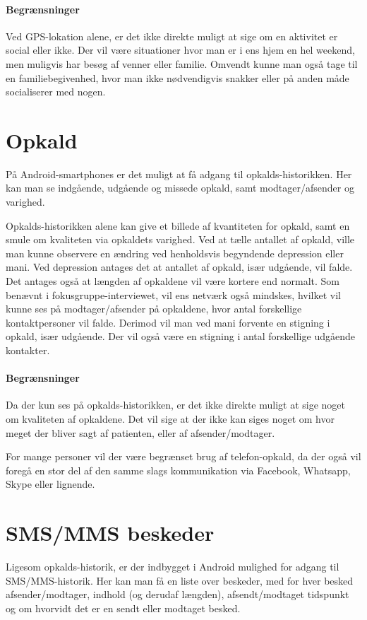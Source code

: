 \paragraph{Begrænsninger}
Ved GPS-lokation alene, er det ikke direkte muligt at sige om en aktivitet er social eller ikke.
Der vil være situationer hvor man er i ens hjem en hel weekend, men muligvis har besøg af venner eller familie.
Omvendt kunne man også tage til en familiebegivenhed, hvor man ikke nødvendigvis snakker eller på anden måde socialiserer med nogen.

\section{Opkald}
På Android-smartphones er det muligt at få adgang til opkalds-historikken.
Her kan man se indgående, udgående og missede opkald, samt modtager/afsender og varighed.

Opkalds-historikken alene kan give et billede af kvantiteten for opkald, samt en smule om kvaliteten via opkaldets varighed.
Ved at tælle antallet af opkald, ville man kunne observere en ændring ved henholdsvis begyndende depression eller mani.
Ved depression antages det at antallet af opkald, især udgående, vil falde.
Det antages også at længden af opkaldene vil være kortere end normalt.
Som benævnt i fokusgruppe-interviewet, vil ens netværk også mindskes, hvilket vil kunne ses på modtager/afsender på opkaldene, hvor antal forskellige kontaktpersoner vil falde.
Derimod vil man ved mani forvente en stigning i opkald, især udgående.
Der vil også være en stigning i antal forskellige udgående kontakter.

\paragraph{Begrænsninger}
Da der kun ses på opkalds-historikken, er det ikke direkte muligt at sige noget om kvaliteten af opkaldene.
Det vil sige at der ikke kan siges noget om hvor meget der bliver sagt af patienten, eller af afsender/modtager.

For mange personer vil der være begrænset brug af telefon-opkald, da der også vil foregå en stor del af den samme slags kommunikation via Facebook, Whatsapp, Skype eller lignende.

\section{SMS/MMS beskeder}
Ligesom opkalds-historik, er der indbygget i Android mulighed for adgang til SMS/MMS-historik.
Her kan man få en liste over beskeder, med for hver besked afsender/modtager, indhold (og derudaf længden), afsendt/modtaget tidspunkt og om hvorvidt det er en sendt eller modtaget besked.

